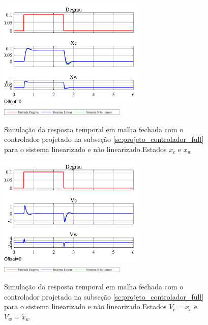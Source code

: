 \documentclass[a4paper]{ifacconf}
\begin{document}
    \FloatBarrier
    \begin{figure}[htbp]
        \begin{centering}
            \includegraphics[width=7cm]{img/simulaca_temporal_nao_linear_realimentacao.png}
            \includegraphics[width=6cm]{img/sim_nao_linear_simulink_temp_leg.png}
            \caption{Simulação da resposta temporal em malha fechada com o controlador projetado na subseção \ref{sc:projeto_controlador_full} para o sistema linearizado e não linearizado.Estados $x_c$ e $x_w$ }
            \label{fig:simulaca_temporal_nao_linear_realimentacao}
        \end{centering}
    \end{figure}
    \FloatBarrier
	
	\FloatBarrier
    \begin{figure}[htbp]
        \begin{centering}
            \includegraphics[width=7cm]{img/simulaca_temporal_nao_linear_realimentacao_V.png}
            \includegraphics[width=6cm]{img/sim_nao_linear_simulink_temp_leg.png}
            \caption{Simulação da resposta temporal em malha fechada com o controlador projetado na subseção \ref{sc:projeto_controlador_full} para o sistema linearizado e não linearizado.Estados $V_c = \dot{x}_c$ e $V_w = \dot{x}_w$ }
            \label{fig:simulaca_temporal_nao_linear_realimentacao_V}
        \end{centering}
    \end{figure}
    \FloatBarrier
    
\end{document}
